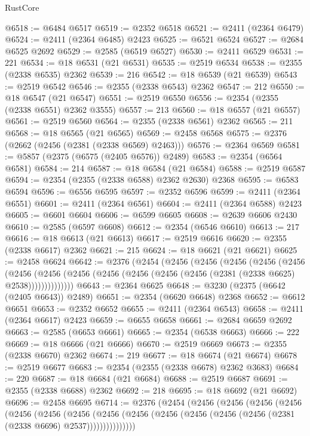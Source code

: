 \begin{lexlean}{RustCore}
\begin{coremodule}
@6518 := @6484 @6517
@6519 := @2352 @6518
@6521 := @2411 (@2364 @6479)
@6524 := @2411 (@2364 @6485) @2423
@6525 := @6521 @6524
@6527 := @2684 @6525 @2692
@6529 := @2585 (@6519 @6527)
@6530 := @2411 @6529
@6531 := 221
@6534 := @18 @6531 (@21 @6531)
@6535 := @2519 @6534
@6538 := @2355 (@2338 @6535) @2362
@6539 := 216
@6542 := @18 @6539 (@21 @6539)
@6543 := @2519 @6542
@6546 := @2355 (@2338 @6543) @2362
@6547 := 212
@6550 := @18 @6547 (@21 @6547)
@6551 := @2519 @6550
@6556 := @2354 (@2355 (@2338 @6551) @2362 @3555)
@6557 := 213
@6560 := @18 @6557 (@21 @6557)
@6561 := @2519 @6560
@6564 := @2355 (@2338 @6561) @2362
@6565 := 211
@6568 := @18 @6565 (@21 @6565)
@6569 := @2458 @6568
@6575 := @2376 (@2662 (@2456 (@2381 (@2338 @6569) @2463)))
@6576 := @2364 @6569
@6581 := @5857 (@2375 (@6575 (@2405 @6576)) @2489)
@6583 := @2354 (@6564 @6581)
@6584 := 214
@6587 := @18 @6584 (@21 @6584)
@6588 := @2519 @6587
@6594 := @2354 (@2355 (@2338 @6588) @2362 @2630) @2368
@6595 := @6583 @6594
@6596 := @6556 @6595
@6597 := @2352 @6596
@6599 := @2411 (@2364 @6551)
@6601 := @2411 (@2364 @6561)
@6604 := @2411 (@2364 @6588) @2423
@6605 := @6601 @6604
@6606 := @6599 @6605
@6608 := @2639 @6606 @2430
@6610 := @2585 (@6597 @6608)
@6612 := @2354 (@6546 @6610)
@6613 := 217
@6616 := @18 @6613 (@21 @6613)
@6617 := @2519 @6616
@6620 := @2355 (@2338 @6617) @2362
@6621 := 215
@6624 := @18 @6621 (@21 @6621)
@6625 := @2458 @6624
@6642 := @2376
    (@2454
      (@2456
        (@2456
          (@2456
            (@2456
              (@2456
                (@2456
                  (@2456 (@2456 (@2456 (@2456 (@2456 (@2456 (@2381 (@2338 @6625) @2538))))))))))))))
@6643 := @2364 @6625
@6648 := @3230 (@2375 (@6642 (@2405 @6643)) @2489)
@6651 := @2354 (@6620 @6648) @2368
@6652 := @6612 @6651
@6653 := @2352 @6652
@6655 := @2411 (@2364 @6543)
@6658 := @2411 (@2364 @6617) @2423
@6659 := @6655 @6658
@6661 := @2684 @6659 @2692
@6663 := @2585 (@6653 @6661)
@6665 := @2354 (@6538 @6663)
@6666 := 222
@6669 := @18 @6666 (@21 @6666)
@6670 := @2519 @6669
@6673 := @2355 (@2338 @6670) @2362
@6674 := 219
@6677 := @18 @6674 (@21 @6674)
@6678 := @2519 @6677
@6683 := @2354 (@2355 (@2338 @6678) @2362 @3683)
@6684 := 220
@6687 := @18 @6684 (@21 @6684)
@6688 := @2519 @6687
@6691 := @2355 (@2338 @6688) @2362
@6692 := 218
@6695 := @18 @6692 (@21 @6692)
@6696 := @2458 @6695
@6714 := @2376
    (@2454
      (@2456
        (@2456
          (@2456
            (@2456
              (@2456
                (@2456
                  (@2456
                    (@2456
                      (@2456 (@2456 (@2456 (@2456 (@2456 (@2381 (@2338 @6696) @2537)))))))))))))))

\end{coremodule}
\end{lexlean}
